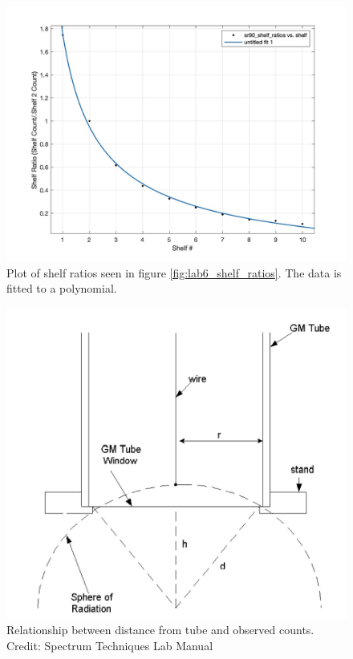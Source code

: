 \documentclass[reprint,amsmath,amssymb,aps,prl]{revtex4-2}
\begin{document}
\begin{figure}
    \centering
    \includegraphics[width = \columnwidth]{Lab6_plot.jpg}
    \caption{Plot of shelf ratios seen in figure \ref{fig:lab6_shelf_ratios}. The data is fitted to a polynomial.}
    \label{fig:lab6_plot}
\end{figure}
\begin{figure}
    \centering
    \includegraphics[width = \columnwidth]{DistanceFromTube.png}
    \caption{Relationship between distance from tube and observed counts. Credit: Spectrum Techniques Lab Manual}
    \label{fig:distanceFromTube}
\end{figure}
\end{document}
